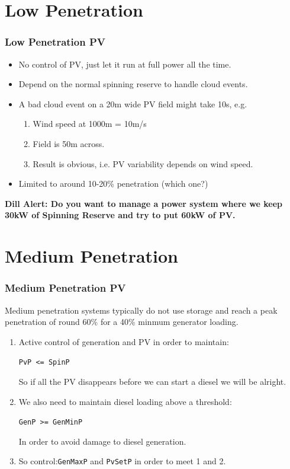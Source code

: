 \documentclass{beamer}
\def\dill#1{\textcolor{RawSienna}{\textbf{Dill Alert: #1}}}
\begin{document}
\section{Low Penetration}
\begin{frame}\frametitle{Low Penetration PV}
  \begin{itemize}
  \item No control of PV, just let it run at full power all the time.
    \pause
  \item Depend on the normal spinning reserve to handle
    cloud events.
    \pause
  \item A bad cloud event on a 20m wide PV field might take 10s, e.g.
    \begin{enumerate}
    \item Wind speed at 1000m = 10m/s
    \item Field is 50m across.
    \item Result is obvious, i.e. PV variability depends on wind speed.
    \end{enumerate}
  \item Limited to around 10-20\% penetration (which one?)
  \end{itemize}
  \dill{Do you want to manage a power system where we keep 30kW of
    Spinning Reserve and try to put 60kW of PV.}
\end{frame}

\section{Medium Penetration}
\begin{frame}\frametitle{Medium Penetration PV}
Medium penetration systems typically do not use storage and
reach a peak penetration of round 60\% for a 40\% minmum generator
loading.
\pause
  \begin{enumerate}
  \item Active control of generation and PV in order to maintain:
    
    \texttt{PvP <= SpinP}

    So if all the PV disappears before we can start a diesel we will
    be alright.
    \pause
  \item We also need to maintain diesel loading above a threshold:
    
    \texttt{GenP >= GenMinP}

    In order to avoid damage to diesel generation.
    \pause
  \item So control:\texttt{GenMaxP} and \texttt{PvSetP} in order to
    meet 1 and 2.
  \end{enumerate}

\end{frame}
\end{document}

